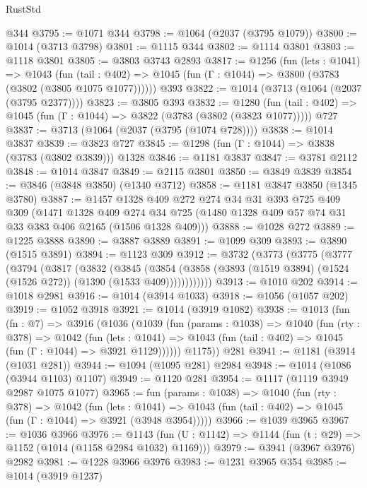 \begin{lexlean}{RustStd}
\begin{coremodule}
    @344
@3795 := @1071 @344
@3798 := @1064 (@2037 (@3795 @1079))
@3800 := @1014 (@3713 @3798)
@3801 := @1115 @344
@3802 := @1114 @3801
@3803 := @1118 @3801
@3805 := @3803 @3743 @2893
@3817 := @1256
    (fun (lets : @1041) =>
    @1043
      (fun (tail : @402) => @1045 (fun (Γ : @1044) => @3800 (@3783 (@3802 (@3805 @1075 @1077))))))
    @393
@3822 := @1014 (@3713 (@1064 (@2037 (@3795 @2377))))
@3823 := @3805 @393
@3832 := @1280
    (fun (tail : @402) => @1045 (fun (Γ : @1044) => @3822 (@3783 (@3802 (@3823 @1077)))))
    @727
@3837 := @3713 (@1064 (@2037 (@3795 (@1074 @728))))
@3838 := @1014 @3837
@3839 := @3823 @727
@3845 := @1298 (fun (Γ : @1044) => @3838 (@3783 (@3802 @3839))) @1328
@3846 := @1181 @3837
@3847 := @3781 @2112
@3848 := @1014 @3847
@3849 := @2115 @3801
@3850 := @3849 @3839
@3854 := @3846 (@3848 @3850) (@1340 @3712)
@3858 := @1181 @3847 @3850 (@1345 @3780)
@3887 := @1457
    @1328
    @409
    @272
    @274
    @34
    @31
    @393
    @725
    @409
    @309
    (@1471
      @1328
      @409
      @274
      @34
      @725
      (@1480 @1328 @409 @57 @74 @31 @33 @383 @406 @2165 (@1506 @1328 @409)))
@3888 := @1028 @272
@3889 := @1225 @3888
@3890 := @3887 @3889
@3891 := @1099 @309
@3893 := @3890 (@1515 @3891)
@3894 := @1123 @309
@3912 := @3732
    (@3773
      (@3775
        (@3777
          (@3794
            (@3817
              (@3832
                (@3845
                  (@3854
                    (@3858 (@3893 (@1519 @3894) (@1524 (@1526 @272)) (@1390 (@1533 @409))))))))))))
@3913 := @1010 @202
@3914 := @1018 @2981
@3916 := @1014 (@3914 @1033)
@3918 := @1056 (@1057 @202)
@3919 := @1052 @3918
@3921 := @1014 (@3919 @1082)
@3938 := @1013
    (fun (fn : @7) =>
    @3916
      (@1036
        (@1039
          (fun (params : @1038) =>
          @1040
            (fun (rty : @378) =>
            @1042
              (fun (lets : @1041) =>
              @1043 (fun (tail : @402) => @1045 (fun (Γ : @1044) => @3921 @1129))))))
        @1175))
    @281
@3941 := @1181 (@3914 (@1031 @281))
@3944 := @1094 (@1095 @281) @2984
@3948 := @1014 (@1086 (@3944 @1103) @1107)
@3949 := @1120 @281
@3954 := @1117 (@1119 @3949 @2987 @1075 @1077)
@3965 := fun (params : @1038) =>
  @1040
    (fun (rty : @378) =>
    @1042
      (fun (lets : @1041) =>
      @1043 (fun (tail : @402) => @1045 (fun (Γ : @1044) => @3921 (@3948 @3954)))))
@3966 := @1039 @3965
@3967 := @1036 @3966
@3976 := @1143 (fun (U : @1142) => @1144 (fun (t : @29) => @1152 (@1014 (@1158 @2984 @1032) @1169)))
@3979 := @3941 (@3967 @3976) @2982
@3981 := @1228 @3966 @3976
@3983 := @1231 @3965 @354
@3985 := @1014 (@3919 @1237)

\end{coremodule}
\end{lexlean}
